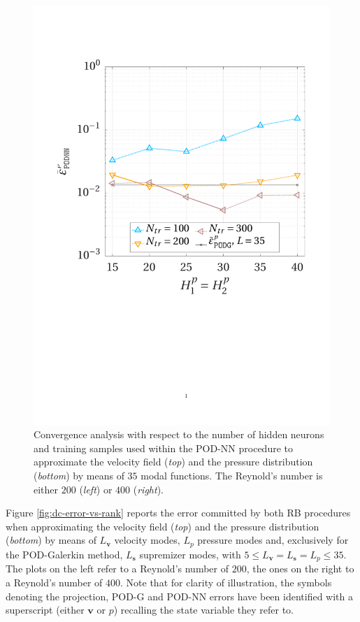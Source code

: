 \documentclass[longtitle]{elsarticle}
\numberwithin{equation}{section}
\theoremstyle{theorem}
\theoremstyle{definition}
\theoremstyle{remark}
\theoremstyle{proposition}
\numberwithin{figure}{section}
\newcommand{\bg}[1]{\boldsymbol{#1}}
\begin{document}
\begin{figure}[h!]
			\includegraphics[scale = 0.37, trim = {1cm 9cm 1.5cm 3.5cm}, clip]{dc_400_p_nn_convergence}
			
			\vspace*{-0.1cm}
			
			\caption{Convergence analysis with respect to the number of hidden neurons and training samples used within the POD-NN procedure to approximate the velocity field (\textcolor{deepgreen}{\emph{top}}) and the pressure distribution (\textcolor{deepgreen}{\emph{bottom}}) by means of $35$ modal functions. The Reynold's number is either $200$ (\textcolor{deepgreen}{\emph{left}}) or $400$ (\textcolor{deepgreen}{\emph{right}}).}
			\label{fig:dc-nn-convergence}
		\end{figure}

		Figure \ref{fig:dc-error-vs-rank} reports the error committed by both RB procedures when approximating the velocity field (\textcolor{deepgreen}{\emph{top}}) and the pressure distribution (\textcolor{deepgreen}{\emph{bottom}}) by means of $L_{\bg{v}}$ velocity modes, $L_p$ pressure modes and, exclusively for the POD-Galerkin method, $L_{\bg{s}}$ supremizer modes, with $5 \leq L_{\bg{v}} = L_{\bg{s}} = L_p \leq 35$. The plots \textcolor{deepgreen}{on the left} refer to a Reynold's number of $200$, the ones \textcolor{deepgreen}{on the right} to a Reynold's number of $400$. Note that for clarity of illustration, the symbols denoting the projection, POD-G and POD-NN errors have been identified with a superscript (either $\bg{v}$ or $p$) recalling the state variable they refer to. 
\end{document}
